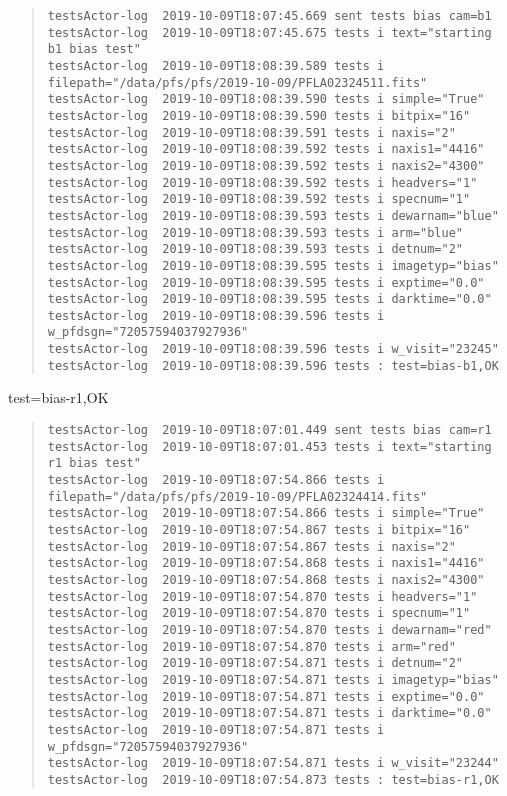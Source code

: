 \begin{quote}
\begin{tiny}
\begin{verbatim}
testsActor-log  2019-10-09T18:07:45.669 sent tests bias cam=b1
testsActor-log  2019-10-09T18:07:45.675 tests i text="starting b1 bias test"
testsActor-log  2019-10-09T18:08:39.589 tests i filepath="/data/pfs/pfs/2019-10-09/PFLA02324511.fits"
testsActor-log  2019-10-09T18:08:39.590 tests i simple="True"
testsActor-log  2019-10-09T18:08:39.590 tests i bitpix="16"
testsActor-log  2019-10-09T18:08:39.591 tests i naxis="2"
testsActor-log  2019-10-09T18:08:39.592 tests i naxis1="4416"
testsActor-log  2019-10-09T18:08:39.592 tests i naxis2="4300"
testsActor-log  2019-10-09T18:08:39.592 tests i headvers="1"
testsActor-log  2019-10-09T18:08:39.592 tests i specnum="1"
testsActor-log  2019-10-09T18:08:39.593 tests i dewarnam="blue"
testsActor-log  2019-10-09T18:08:39.593 tests i arm="blue"
testsActor-log  2019-10-09T18:08:39.593 tests i detnum="2"
testsActor-log  2019-10-09T18:08:39.595 tests i imagetyp="bias"
testsActor-log  2019-10-09T18:08:39.595 tests i exptime="0.0"
testsActor-log  2019-10-09T18:08:39.595 tests i darktime="0.0"
testsActor-log  2019-10-09T18:08:39.596 tests i w_pfdsgn="72057594037927936"
testsActor-log  2019-10-09T18:08:39.596 tests i w_visit="23245"
testsActor-log  2019-10-09T18:08:39.596 tests : test=bias-b1,OK
\end{verbatim}
\end{tiny}
\end{quote}

\noindent test=bias-r1,OK

\begin{quote}
\begin{tiny}
\begin{verbatim}
testsActor-log  2019-10-09T18:07:01.449 sent tests bias cam=r1
testsActor-log  2019-10-09T18:07:01.453 tests i text="starting r1 bias test"
testsActor-log  2019-10-09T18:07:54.866 tests i filepath="/data/pfs/pfs/2019-10-09/PFLA02324414.fits"
testsActor-log  2019-10-09T18:07:54.866 tests i simple="True"
testsActor-log  2019-10-09T18:07:54.867 tests i bitpix="16"
testsActor-log  2019-10-09T18:07:54.867 tests i naxis="2"
testsActor-log  2019-10-09T18:07:54.868 tests i naxis1="4416"
testsActor-log  2019-10-09T18:07:54.868 tests i naxis2="4300"
testsActor-log  2019-10-09T18:07:54.870 tests i headvers="1"
testsActor-log  2019-10-09T18:07:54.870 tests i specnum="1"
testsActor-log  2019-10-09T18:07:54.870 tests i dewarnam="red"
testsActor-log  2019-10-09T18:07:54.870 tests i arm="red"
testsActor-log  2019-10-09T18:07:54.871 tests i detnum="2"
testsActor-log  2019-10-09T18:07:54.871 tests i imagetyp="bias"
testsActor-log  2019-10-09T18:07:54.871 tests i exptime="0.0"
testsActor-log  2019-10-09T18:07:54.871 tests i darktime="0.0"
testsActor-log  2019-10-09T18:07:54.871 tests i w_pfdsgn="72057594037927936"
testsActor-log  2019-10-09T18:07:54.871 tests i w_visit="23244"
testsActor-log  2019-10-09T18:07:54.873 tests : test=bias-r1,OK
\end{verbatim}
\end{tiny}
\end{quote}

